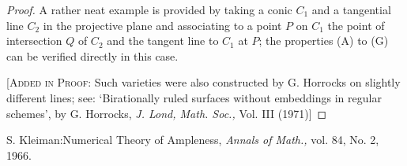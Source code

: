 \begin{proof}
A rather neat example is provided by taking a conic $C_1$ and a tangential line $C_2$ in the projective plane and associating to a point $P$ on $C_1$ the point of intersection $Q$ of $C_2$ and the tangent line to $C_1$ at $P$; the properties (A) to (G) can be verified directly in this case. 

\vskip 0.3cm
[\textsc{Added in Proof:} Such varieties were also constructed by G. Horrocks on slightly different lines; see: `Birationally ruled surfaces without embeddings in regular schemes', by G. Horrocks, {\em J. Lond, Math. Soc.,} Vol. III (1971)]
\end{proof}

\begin{thebibliography}{99}
 S. Kleiman:\pageoriginale Numerical Theory of Ampleness, {\em Annals of Math., } vol. 84, No. 2, 1966.
\end{thebibliography}
